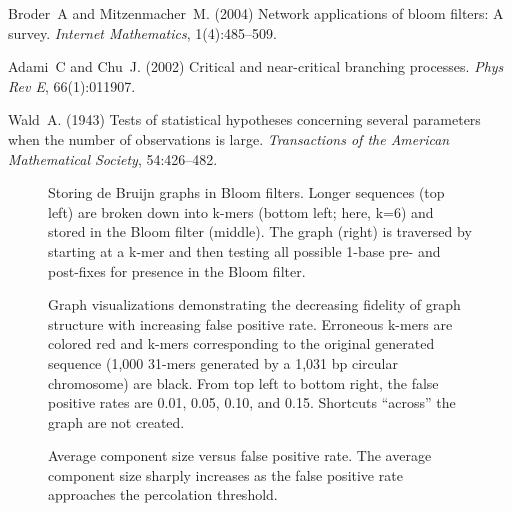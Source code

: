 \documentclass[draft]{pnastwo}
\begin{document}
\begin{article}
\begin{thebibliography}{10}
Broder~A and Mitzenmacher~M. (2004) Network applications of bloom filters: 
A survey. {\it Internet Mathematics}, 1(4):485--509.

 Adami~C and Chu~J. (2002) Critical and 
near-critical branching processes. {\it Phys Rev E}, 66(1):011907.

 Wald~A. (1943) Tests of statistical hypotheses concerning 
several parameters when the number of observations is large. {\it Transactions 
of the American Mathematical Society}, 54:426--482.

\end{thebibliography}

\end{article}


\begin{figure}
\centering
\caption{Storing de Bruijn graphs in Bloom filters.  Longer sequences (top left) are broken down into k-mers (bottom left; here, k=6) and stored in the Bloom filter (middle).
The graph (right) is traversed by starting at a k-mer and then testing all possible 1-base pre- and post-fixes for presence in the Bloom filter.}

\label{fig:bloomgraph}
\end{figure}


\begin{figure}

\caption{Graph visualizations demonstrating the decreasing fidelity of
  graph structure with increasing false positive rate. Erroneous k-mers are 
  colored red and k-mers corresponding to the original generated sequence 
  (1,000 31-mers generated by a 
  1,031 bp circular chromosome) 
  are black. From top left
  to bottom right, the false positive rates are 0.01, 0.05, 0.10, and
  0.15.  Shortcuts ``across'' the graph are not created.}

\label{fig:circles}
\end{figure}


\begin{figure}
\caption{Average component size versus false positive rate. The average 
component size sharply increases as the false positive 
rate approaches the percolation threshold.
}
\label{fig:clustersize}
\end{figure}
\end{document}
